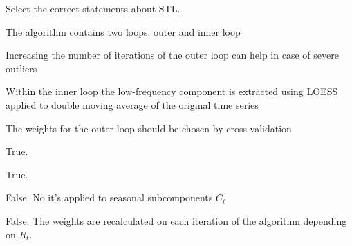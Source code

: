 
\begin{question}
Select the correct statements about STL.
\begin{answerlist}
  \item The algorithm contains two loops: outer and inner loop
  \item Increasing the number of iterations of the outer loop can help in case of severe outliers
  \item Within the inner loop the low-frequency component is extracted using LOESS applied to double moving average of the original time series
  \item The weights for the outer loop should be chosen by cross-validation
\end{answerlist}
\end{question}

\begin{solution}
\begin{answerlist}
  \item True.
  \item True.
  \item False. No it's applied to seasonal subcomponents \(C_t\)
  \item False. The weights are recalculated on each iteration of the algorithm depending on \(R_t\).
\end{answerlist}
\end{solution}


